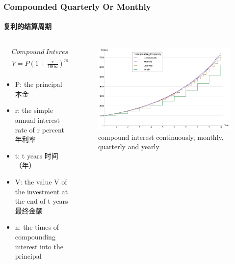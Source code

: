 \documentclass[
	11pt, %
	handout,
]{beamer}
\begin{document}
\begin{frame}
	\frametitle{Compounded Quarterly Or Monthly}
	\framesubtitle{复利的结算周期}

	\begin{columns}[t] 
		\begin{column}{0.5\textwidth} %
			\begin{equation*}
			  \begin{aligned}
			  	&Compound\ Interest:\\ 	&V =P(1 + \frac{r}{100n})^{nt}\\
			  \end{aligned}
			\end{equation*}
			\begin{itemize}
				\item P: the principal 本金 
			  \item		r:  the simple annual interest rate of r  percent  年利率
			  \item		t:  t years  时间（年）
			  \item		V:  the value V of the investment at the end of t years  最终金额
			  \item n: the times of compounding interest into the principal
			\end{itemize}
		\end{column}

		\begin{column}{0.5\textwidth} %
			\begin{figure}
				\includegraphics[width=\linewidth]{Compound_Interest_with_Varying_Frequencies.svg.png}
				\caption{compound interest continuously, monthly, quarterly and yearly}
			\end{figure}
    \end{column}
	\end{columns}
\end{frame}
\end{document}
